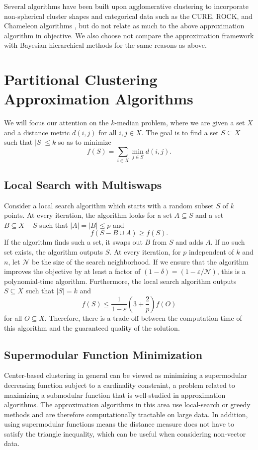 \documentclass{article}
\begin{document}
Several algorithms have been built upon agglomerative clustering to incorporate non-spherical cluster shapes and categorical data such as the CURE, ROCK, and Chameleon algorithms \cite{Guha_CURE, Guha_ROCK, Karypis}, but do not relate as much to the above approximation algorithm in objective. We also choose not compare the approximation framework with Bayesian hierarchical methods for the same reasons as above. 

\section{Partitional Clustering Approximation Algorithms}

We will focus our attention on the $k$-median problem, where we are given a set $X$ and a distance metric $d(i,j)$ for all $i,j \in X$. The goal is to find a set $S \subseteq X$ such that $|S| \leq k$ so as to minimize 
\[ f(S) = \sum_{ i\in X} \min_{j \in S} d(i,j). \]

\subsection{Local Search with Multiswaps}
Consider a local search algorithm which starts with a random subset $S$ of $k$ points. At every iteration, the algorithm looks for a set $A \subseteq S$ and a set $B \subseteq X -S$ such that $|A| = |B| \leq p$ and
\[ f(S- B \cup A) \geq f(S). \]
If the algorithm finds such a set, it swaps out $B$ from $S$ and adds $A$. If no such set exists, the algorithm outputs $S$. At every iteration, for $p$ independent of $k$ and $n$, let $\mathcal{N}$ be the size of the search neighborhood. If we ensure that the algorithm improves the objective by at least a factor of $(1- \delta) = (1- \varepsilon/\mathcal{N})$, this is a polynomial-time algorithm. Furthermore, the local search algorithm outputs $S \subseteq X$ such that $|S| = k$ and
\[ f(S) \leq \frac{1}{1-\varepsilon} \left (3 + \frac{2}{p} \right ) f(O) \]
for all $O \subseteq X$. Therefore, there is a trade-off between the computation time of this algorithm and the guaranteed quality of the solution. 

\subsection{Supermodular Function Minimization}
Center-based clustering in general can be viewed as minimizing a supermodular decreasing function subject to a cardinality constraint, a problem related to maximizing a submodular function that is well-studied in approximation algorithms. The approximation algorithms in this area use local-search or greedy methods and are therefore computationally tractable on large data. In addition, using supermodular functions means the distance measure does not have to satisfy the triangle inequality, which can be useful when considering non-vector data.
\end{document}
